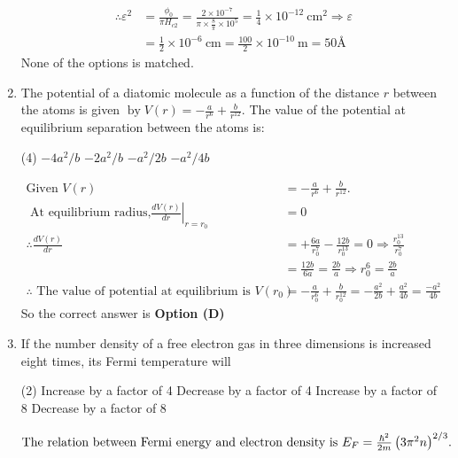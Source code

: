 \begin{enumerate}
\begin{answer}
\begin{align*}
	\therefore \varepsilon^{2}&=\frac{\phi_{0}}{\pi H_{c 2}}=\frac{2 \times 10^{-7}}{\pi \times \frac{8}{\pi} \times 10^{5}}=\frac{1}{4} \times 10^{-12} \mathrm{~cm}^{2} \Rightarrow \varepsilon\\&=\frac{1}{2} \times 10^{-6} \mathrm{~cm}=\frac{100}{2} \times 10^{-10} \mathrm{~m}=50 \text{\AA}
	\end{align*}
	None of the options is matched.
\end{answer}
	\item The potential of a diatomic molecule as a function of the distance $r$ between the atoms is given $\operatorname{by} V(r)=-\frac{a}{r^{6}}+\frac{b}{r^{12}} .$ The value of the potential at equilibrium separation between the atoms is:
	{}
\begin{tasks}(4)
\task[\textbf{A.}] $-4 a^{2} / b$
\task[\textbf{B.}] $-2 a^{2} / b$
\task[\textbf{C.}] $-a^{2} / 2 b$
\task[\textbf{D.}] $-a^{2} / 4 b$
\end{tasks}
\begin{answer}
\begin{align*}
\text{Given }V(r)&=-\frac{a}{r^{6}}+\frac{b}{r^{12}} .\\\text{ At equilibrium radius,} \left.\frac{d V(r)}{d r}\right|_{r=r_{0}}&=0\\
\therefore \frac{d V(r)}{d r}&=+\frac{6 a}{r_{0}^{7}}-\frac{12 b}{r_{0}^{13}}=0 \Rightarrow \frac{r_{0}^{13}}{r_{0}^{7}}\\&=\frac{12 b}{6 a}=\frac{2 b}{a} \Rightarrow r_{0}^{6}=\frac{2 b}{a}\\
\therefore\text{ The value of potential at equilibrium is } V\left(r_{0}\right)&=-\frac{a}{r_{0}^{6}}+\frac{b}{r_{0}^{12}}=-\frac{a^{2}}{2 b}+\frac{a^{2}}{4 b}=\frac{-a^{2}}{4 b}
\end{align*}
So the correct answer is \textbf{Option (D)}
\end{answer}
	\item If the number density of a free electron gas in three dimensions is increased eight times, its Fermi temperature will
	{}
\begin{tasks}(2)
\task[\textbf{A.}] Increase by a factor of 4
\task[\textbf{B.}]  Decrease by a factor of 4
\task[\textbf{C.}] Increase by a factor of 8
\task[\textbf{D.}]  Decrease by a factor of 8
\end{tasks}
\begin{answer}
\begin{align*}
\intertext{The relation between Fermi energy and electron density is $E_{F}=\frac{\hbar^{2}}{2 m}\left(3 \pi^{2} n\right)^{2 / 3}$.}

\end{align*}
\end{answer}
\end{enumerate}
